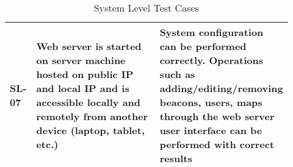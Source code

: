 \begin{table}[h!]
\begin{tabular}{|p{0.07\linewidth}|p{0.45\linewidth}|p{0.40\linewidth}|}
    \hline
    SL-07
    & Web server is started on server machine hosted on public IP and local IP and  is accessible locally and remotely from another device (laptop, tablet, etc.)
    & System configuration can be performed correctly. Operations such as adding/editing/removing beacons, users, maps through the web server user interface can be performed with correct results\\ 

    \hline
    \end{tabular}
    \caption{System Level Test Cases}
\end{table}
















